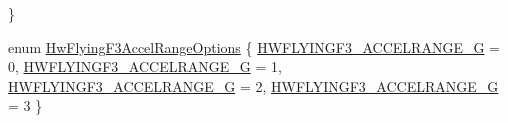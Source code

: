 \begin{DoxyCompactItemize}
 \}
\item 
enum \hyperlink{group___hw_flying_f3_ga0b236471af642665e143891f6c284a3e}{\-Hw\-Flying\-F3\-Accel\-Range\-Options} \{ \hyperlink{group___hw_flying_f3_gga0b236471af642665e143891f6c284a3eaadc5769e10ad41fe0b524119e19b7dc8}{\-H\-W\-F\-L\-Y\-I\-N\-G\-F3\-\_\-\-A\-C\-C\-E\-L\-R\-A\-N\-G\-E\-\_\-G} = 0, 
\hyperlink{group___hw_flying_f3_gga0b236471af642665e143891f6c284a3ead0b11be1454e91a50d7b4c48a550516c}{\-H\-W\-F\-L\-Y\-I\-N\-G\-F3\-\_\-\-A\-C\-C\-E\-L\-R\-A\-N\-G\-E\-\_\-G} = 1, 
\hyperlink{group___hw_flying_f3_gga0b236471af642665e143891f6c284a3ea2c436baf49a5d2fe3222fff4ac1d66b0}{\-H\-W\-F\-L\-Y\-I\-N\-G\-F3\-\_\-\-A\-C\-C\-E\-L\-R\-A\-N\-G\-E\-\_\-G} = 2, 
\hyperlink{group___hw_flying_f3_gga0b236471af642665e143891f6c284a3ea3b367134214d8d41dcfcee389d405273}{\-H\-W\-F\-L\-Y\-I\-N\-G\-F3\-\_\-\-A\-C\-C\-E\-L\-R\-A\-N\-G\-E\-\_\-G} = 3
 \}
\end{DoxyCompactItemize}
